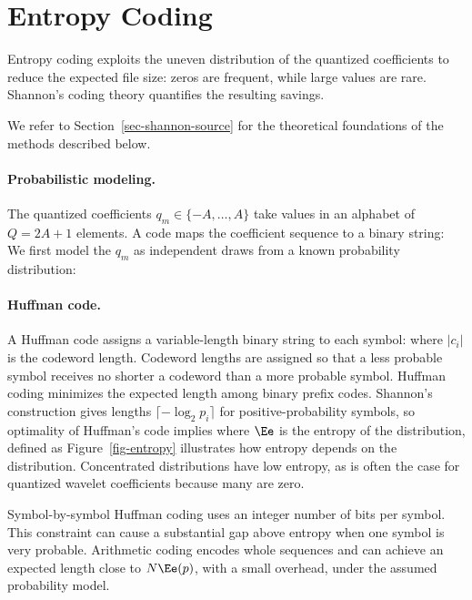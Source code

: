 \section{Entropy Coding}
\label{subsec-entropic-coding}

Entropy coding exploits the uneven distribution of the quantized coefficients to reduce the expected file size: zeros are frequent, while large values are rare. Shannon's coding theory \cite{shannon-information} quantifies the resulting savings.

We refer to Section~\ref{sec-shannon-source} for the theoretical foundations of the methods described below.


  
\paragraph{Probabilistic modeling.}

The quantized coefficients $q_m \in \{-A,\ldots,A\}$ take values in an alphabet of $Q=2A+1$ elements.
A code maps the coefficient sequence to a binary string:
We first model the $q_m$ as independent draws from a known probability distribution:

  
\paragraph{Huffman code.}

A Huffman code assigns a variable-length binary string to each symbol:
where $|c_i|$ is the codeword length. Codeword lengths are assigned so that a less probable symbol receives no shorter a codeword than a more probable symbol.
Huffman coding minimizes the expected length among binary prefix codes. Shannon's construction gives lengths $\lceil-\log_2p_i\rceil$ for positive-probability symbols, so optimality of Huffman's code implies
where $\Ee$ is the entropy of the distribution, defined as
Figure~\ref{fig-entropy} illustrates how entropy depends on the distribution. Concentrated distributions have low entropy, as is often the case for quantized wavelet coefficients because many are zero.

Symbol-by-symbol Huffman coding uses an integer number of bits per symbol. This constraint can cause a substantial gap above entropy when one symbol is very probable. Arithmetic coding encodes whole sequences and can achieve an expected length close to $N\Ee(p)$, with a small overhead, under the assumed probability model.

